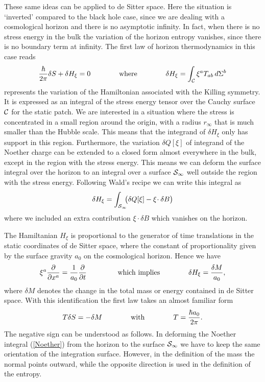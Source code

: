 \documentclass[a4paper,12pt]{article}
\newcommand{\be}{\begin{equation}}
\newcommand{\ee}{\end{equation}}
\begin{document}
These same ideas can be applied to de Sitter space. Here the situation is `inverted' compared to the black hole case, since we are dealing with a cosmological horizon and there is no asymptotic infinity.
In fact, when there is no stress energy in the bulk the variation of the horizon entropy vanishes, since there is no boundary term at infinity.  The first law of horizon thermodynamics in this case reads \cite{Jacobson2, Gibbons-Hawking}
\be
\label{desitter1stlaw}
{\hbar \over 2\pi}\delta S +\delta H_\xi=0
\qquad\qquad\mbox{where}
\qquad\qquad
\delta H_\xi  = \int_{\cal C} \xi^a T_{ab} \, d\Sigma^b
\ee
represents the variation of the Hamiltonian associated with the Killing symmetry. It is expressed as an 
integral of the stress energy tensor over the Cauchy surface $\cal C$ for the static patch. We are interested in a situation where the stress is concentrated in a small region around the origin, with a radius $r_\infty$ that is much smaller than the Hubble scale. This means that the integrand of $\delta H_\xi$ only has support in this region. Furthermore, the variation $\delta Q[\xi]$ of integrand of the Noether charge can be extended to a closed form almost everywhere in the bulk, except in the region with the stress energy. This means we can deform the surface integral over the horizon to an integral over a surface ${\cal S}_\infty$ well outside the region with the stress energy.  Following Wald's recipe we can write this integral as 
\be
\label{deltaK}
 {\delta H_\xi }  = \int_{{\cal S}_\infty}\!\! \bigl(\delta Q[\xi] -\xi\!\cdot\delta B\bigr) 
\ee
where we included an extra contribution $\xi\!\cdot\delta B$ which vanishes on the horizon. 






The Hamiltanian $H_\xi$ is proportional to the generator of time 
translations in the static coordinates of de Sitter space, where the constant of proportionality given by the surface gravity $a_0$ on the cosmological horizon. Hence we have
\be
\label{KtoM}
\xi^a{\partial\over \partial x^a} = {1\over a_0} {\partial\over \partial t}  \qquad\qquad\mbox{ which implies}\qquad\qquad  \delta H_\xi ={\delta M\over a_0}, 
\ee
where $\delta M$ denotes the change in the total mass or energy contained in de Sitter space. 
With this identification the first law takes an almost familiar form
\be
T \delta S = -\delta M   \qquad\qquad\mbox{with}\qquad\qquad   T={\hbar a_0 \over 2\pi}.
\ee
The negative sign can be understood  as follows. In deforming the Noether integral (\ref{Noether}) from the horizon to the surface ${\cal S}_\infty$  %
 we have to keep the same orientation of the integration surface.  However, in the definition of the 
 mass the normal points outward, while the opposite direction is used in the definition 
 of the entropy. 
   
\end{document}
